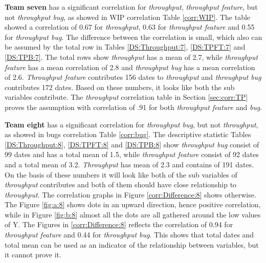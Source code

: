 \documentclass[UKenglish]{ifimaster}  %
\begin{document}
\textbf{Team seven} has a significant correlation for \textit{throughput}, \textit{throughput feature}, but not \textit{throughput bug}, as showed in WIP correlation Table \ref{corr:WIP}. The table showed a correlation of 0.67 for \textit{throughput}, 0.63 for \textit{throughput feature} and 0.55 for \textit{throughput bug}. The difference between the correlation  is small, which also can be assumed by the total row in Tables \ref{DS:Throughput:7},  \ref{DS:TPFT:7} and \ref{DS:TPB:7}. The total rows show \textit{throughput} has a mean of 2.7, while \textit{throughput feature} has a mean correlation of 2.8 and \textit{throughput bug} has a mean correlation of 2.6. \textit{Throughput feature} contributes 156 dates to \textit{throughput} and \textit{throughput bug} contributes 172 dates. Based on these numbers, it looks like both the sub variables contribute. The \textit{throughput} correlation table in Section \ref{sec:corr:TP} proves the assumption with correlation of .91 for both \textit{throughput feature} and \textit{bug}.  

\textbf{Team eight} has a significant correlation for \textit{throughput bug}, but not \textit{throughput}, as showed in bugs correlation Table \ref{corr:bug}. The descriptive statistic Tables \ref{DS:Throughput:8}, \ref{DS:TPFT:8} and \ref{DS:TPB:8} show \textit{throughput bug} consist of 99 dates and has a total mean of 1.5, while \textit{throughput feature} consist of 92 dates and a total mean of 3.2. \textit{Throughput} has mean of 2.3 and contains of 191 dates.  On the basis of these numbers it will look like both of the sub variables of \textit{throughput} contributes and both of them should have close relationship to \textit{throughput}.  The correlation graphs in Figure \ref{corr:Difference:8} shows otherwise. The Figure \ref{fig:a:8} shows dots in an upward direction, hence positive correlation, while in Figure \ref{fig:b:8} almost all the dots are all gathered around the low values of Y. The Figures in \ref{corr:Difference:8} reflects the correlation of 0.94 for \textit{throughput feature} and 0.44 for \textit{throughput bug}.  This shows that total dates and total mean can be used as an indicator of the relationship between variables, but it cannot prove it.
\end{document}
